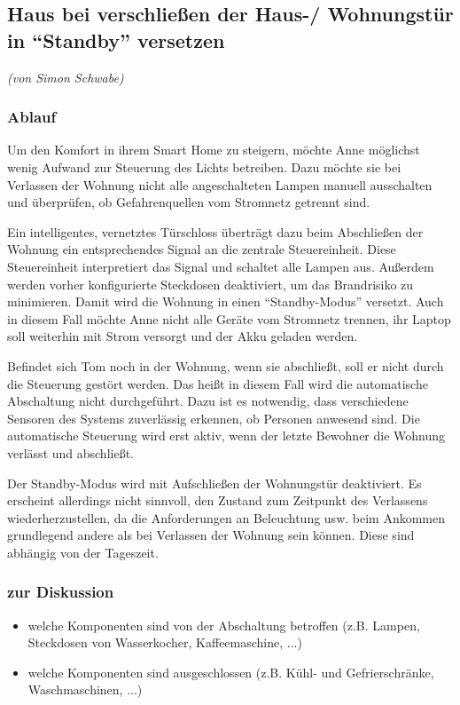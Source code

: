 \newpage

\subsection{Haus bei verschließen der Haus-/ Wohnungstür in "`Standby"' versetzen}
\label{subsec:szenarioStandby}
\emph{(von Simon Schwabe)}
\subsubsection{Ablauf}
Um den Komfort in ihrem Smart Home zu steigern, möchte Anne möglichst wenig Aufwand zur Steuerung des Lichts betreiben. Dazu möchte sie bei Verlassen der Wohnung nicht alle angeschalteten Lampen manuell ausschalten und überprüfen, ob Gefahrenquellen vom Stromnetz getrennt sind.

Ein intelligentes, vernetztes Türschloss überträgt dazu beim Abschließen der Wohnung ein entsprechendes Signal an die zentrale Steuereinheit. Diese Steuereinheit interpretiert das Signal und schaltet alle Lampen aus. Außerdem werden vorher konfigurierte Steckdosen deaktiviert, um das Brandrisiko zu minimieren. Damit wird die Wohnung in einen "`Standby-Modus"' versetzt. Auch in diesem Fall möchte Anne nicht alle Geräte vom Stromnetz trennen, ihr Laptop soll weiterhin mit Strom versorgt und der Akku geladen werden.

Befindet sich Tom noch in der Wohnung, wenn sie abschließt, soll er nicht durch die Steuerung gestört werden. Das heißt in diesem Fall wird die automatische Abschaltung nicht durchgeführt. Dazu ist es notwendig, dass verschiedene Sensoren des Systems zuverlässig erkennen, ob Personen anwesend sind. Die automatische Steuerung wird erst aktiv, wenn der letzte Bewohner die Wohnung verlässt und abschließt.

Der Standby-Modus wird mit Aufschließen der Wohnungstür deaktiviert. Es erscheint allerdings nicht sinnvoll, den Zustand zum Zeitpunkt des Verlassens wiederherzustellen, da die Anforderungen an Beleuchtung usw. beim Ankommen grundlegend andere als bei Verlassen der Wohnung sein können. Diese sind abhängig von der Tageszeit.

\subsubsection{zur Diskussion}
\begin{itemize}
	\item welche Komponenten sind von der Abschaltung betroffen (z.B. Lampen, Steckdosen von Wasserkocher, Kaffeemaschine, ...)
	\item welche Komponenten sind ausgeschlossen (z.B. Kühl- und Gefrierschränke, Waschmaschinen, ...)
\end{itemize}

